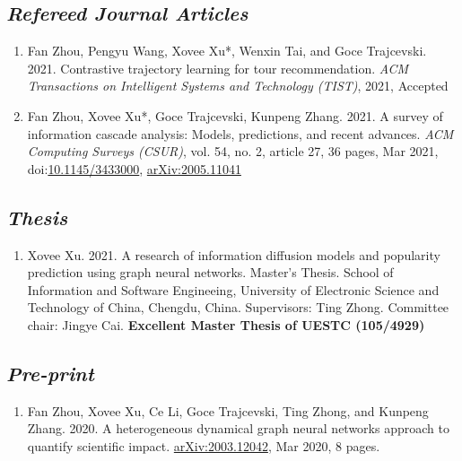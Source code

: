 \subsection*{\textnormal{\textit{Refereed Journal Articles}}}

\begin{enumerate}[resume]
    \item Fan Zhou, Pengyu Wang, Xovee Xu*, Wenxin Tai, and Goce Trajcevski. 2021. Contrastive trajectory learning for tour recommendation. \textit{ACM Transactions on Intelligent Systems and Technology (TIST)}, 2021, Accepted
    \item Fan Zhou, Xovee Xu*, Goce Trajcevski, Kunpeng Zhang. 2021. A survey of information cascade analysis: Models, predictions, and recent advances. \textit{ACM Computing Surveys (CSUR)}, vol. 54, no. 2, article 27, 36 pages, Mar 2021, doi:\href{https://xovee.cn/html/paper-redirects/csur2021.html}{10.1145/3433000}, \href{https://arxiv.org/abs/2005.11041}{arXiv:2005.11041}
\end{enumerate}

\subsection*{\textnormal{\textit{Thesis}}}

\begin{enumerate}[resume]
    \item Xovee Xu. 2021. A research of information diffusion models and popularity prediction using graph neural networks. Master's Thesis. School of Information and Software Engineeing, University of Electronic Science and Technology of China, Chengdu, China. Supervisors: Ting Zhong. Committee chair: Jingye Cai. \newline
    \textbf{\color{red}Excellent Master Thesis of UESTC (105/4929)}
\end{enumerate}

\subsection*{\textnormal{\textit{Pre-print}}}

\begin{enumerate}[resume]
    \item Fan Zhou, Xovee Xu, Ce Li, Goce Trajcevski, Ting Zhong, and Kunpeng Zhang. 2020. A heterogeneous dynamical graph neural networks approach to quantify scientific impact. \href{https://arxiv.org/abs/2003.12042}{arXiv:2003.12042}, Mar 2020, 8 pages. 
\end{enumerate}

